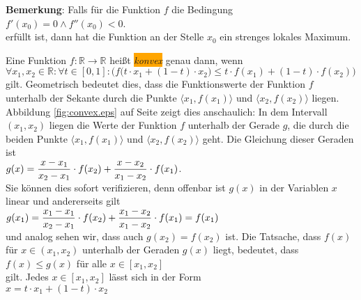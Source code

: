 \noindent
\textbf{Bemerkung}: Falls f\"ur die Funktion $f$ die Bedingung
\\[0.2cm]
\hspace*{1.3cm}
$f'(x_0) = 0 \wedge f''(x_0) < 0$.
\\[0.2cm]
erf\"ullt ist, dann hat die Funktion an der Stelle $x_0$ ein strenges lokales Maximum. \eox


\begin{Definition}
Eine Funktion $f:\mathbb{R} \rightarrow \mathbb{R}$ hei{\ss}t \colorbox{orange}{\emph{konvex}} genau dann, wenn 
\\[0.2cm]
\hspace*{1.3cm}
$\forall x_1,x_2 \in \mathbb{R}:\forall t\in [0,1]: \bigl(
  f\bigl(t \cdot x_1 + (1-t)\cdot x_2\bigr) \leq t \cdot f(x_1) + (1 - t) \cdot f(x_2)
  \bigr)
$
\\[0.2cm]
gilt.  Geometrisch bedeutet dies, dass die Funktionswerte der Funktion $f$  unterhalb
der Sekante durch die Punkte 
$\bigl\langle x_1, f(x_1) \bigl\rangle$ und $\bigl\langle x_2, f(x_2) \bigl\rangle$
liegen.  Abbildung \ref{fig:convex.eps} auf Seite \pageref{fig:convex.eps} zeigt dies anschaulich: 
In dem Intervall $(x_1,x_2)$ liegen die Werte der Funktion $f$ unterhalb der Gerade $g$, die durch die beiden Punkte 
$\langle x_1, f(x_1)\rangle$ und $\langle x_2, f(x_2)\rangle$ geht.  Die Gleichung dieser Geraden
ist 
\\[0.2cm]
\hspace*{1.3cm}
$\displaystyle g(x) = \frac{x-x_1}{x_2-x_1}\cdot f(x_2) + \frac{x-x_2}{x_1-x_2}\cdot f(x_1)$.
\\[0.2cm]
Sie k\"onnen dies sofort verifizieren, denn offenbar ist $g(x)$ in der Variablen $x$ linear und
andererseits gilt
\\[0.2cm]
\hspace*{1.3cm}
$\displaystyle g(x_1) = \frac{x_1-x_1}{x_2-x_1}\cdot f(x_2)+\frac{x_1-x_2}{x_1-x_2}\cdot f(x_1) = f(x_1)$
\\[0.2cm]
und analog sehen wir, dass auch $g(x_2) = f(x_2)$ ist.  Die Tatsache, dass $f(x)$ f\"ur $x \in (x_1,x_2)$
unterhalb der Geraden $g(x)$ liegt, bedeutet, dass
\\[0.2cm]
\hspace*{1.3cm}
$f(x) \leq g(x)$  \quad f\"ur alle $x \in [x_1,x_2]$
\\[0.2cm]
gilt.  Jedes $x \in [x_1,x_2]$ l\"asst sich in der Form
\\[0.2cm]
\hspace*{1.3cm}
$x = t \cdot x_1 + (1-t) \cdot x_2$
\\[0.2cm]

\end{Definition}
